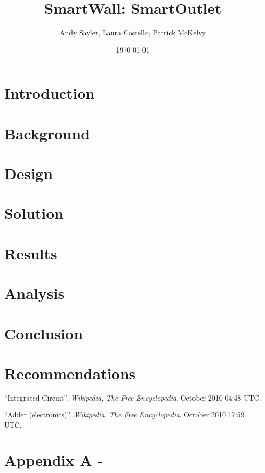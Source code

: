 \documentclass[12pt]{article}
\title{SmartWall: SmartOutlet}
\author{Andy Sayler, Laura Costello, Patrick McKelvy}
\date{\today}
\begin{document}
\maketitle
    
\begin{abstract}

  
\end{abstract}

\tableofcontents

\pagebreak

\section{Introduction}


\section{Background}


\section{Design}


\section{Solution}


\section{Results}


\section{Analysis}


\section{Conclusion}


\section{Recommendations}


\renewcommand{\refname}{\section{References}}
\begin{thebibliography}{1}

 ``Integrated Circuit''. 
  \newblock \emph{Wikipedia, The Free Encyclopedia}.
   October 2010 04:48 UTC.

 ``Adder (electronics)''. 
  \newblock \emph{Wikipedia, The Free Encyclopedia}.
   October 2010 17:59 UTC.

\end{thebibliography}

\pagebreak

\section{Appendix A - }

\pagebreak
\end{document}
